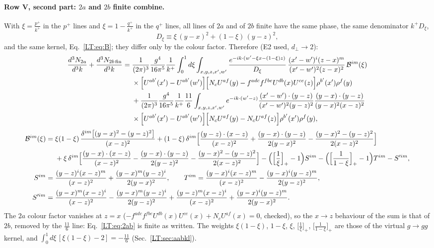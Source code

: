 \documentclass[10pt]{article}
\numberwithin{equation}{section}
\begin{document}
\paragraph{Row V, second part: $2a$ and $2b$ finite combine.} With $\xi=\frac{p^+}{k^+}$ in the $p^+$ lines and $\xi=1-\frac{q^+}{k^+}$ in the $q^+$ lines, all lines of $2a$ and of $2b$ finite have the same phase, the same denominator $k^+D_\xi$,
\begin{equation}
D_\xi\equiv\xi\,(y-x)^2+(1-\xi)\,(y-z)^2,
\end{equation}
and the same kernel, Eq.~\eqref{LT:eq:B}; they differ only by the colour factor. Therefore (E2 used, $d_\perp\to2$):
\begin{align}
\frac{d^3N_{2a}}{d^3k}+\frac{d^3N_{2b\,\rm fin}}{d^3k}={}&\frac{1}{(2\pi)^3}\frac{g^4}{16\pi^5}\frac1{k^+}\int_0^1d\xi\int_{x,y,z,x',w'}\frac{e^{-ik\cdot(w'-\xi x-(1-\xi)z)}}{D_\xi}\,\frac{(x'-w')^{i}(z-x)^{m}}{(x'-w')^{2}(z-x)^{2}}\,\mathcal B^{im}(\xi)\notag\\
&\times\Big[U^{ab'}(x')-U^{ab'}(w')\Big]\Big[N_cU^{af}(y)-f^{adc}f^{fbe}U^{db}(x)U^{ce}(z)\Big]\rho^{b'}(x')\rho^f(y)\notag\\
&+\frac{1}{(2\pi)^{3}}\frac{g^{4}}{16\pi^{5}}\frac{1}{k^{+}}\frac{11}{6}\int_{x,y,z,x',w'}e^{-ik\cdot(w'-z)}\frac{(x'-w')\cdot(y-z)}{(x'-w')^{2}(y-z)^{2}}\frac{(y-x)\cdot(y-z)}{(y-x)^{2}(x-z)^{2}}\notag\\
&\times\Big[U^{ab'}(x')-U^{ab'}(w')\Big]\Big[N_cU^{af}(y)-N_cU^{af}(z)\Big]\rho^{b'}(x')\rho^{f}(y),\label{LT:eq:2ab}
\end{align}
\begin{align}
\mathcal B^{im}(\xi)={}&\xi(1-\xi)\,\frac{\delta^{im}\big[(y-x)^2-(y-z)^2\big]}{(x-z)^2}+(1-\xi)\,\delta^{im}\Big[\frac{(y-z)\cdot(x-z)}{(x-z)^{2}}+\frac{(y-x)\cdot(y-z)}{2(y-x)^{2}}-\frac{(y-x)^{2}-(y-z)^{2}}{2(x-z)^{2}}\Big]\notag\\
&+\xi\,\delta^{im}\Big[\frac{(y-x)\cdot(x-z)}{(x-z)^{2}}-\frac{(y-x)\cdot(y-z)}{2(y-z)^{2}}-\frac{(y-x)^{2}-(y-z)^{2}}{2(x-z)^{2}}\Big]-\Big(\Big[\frac1\xi\Big]_+-1\Big)S^{im}-\Big(\Big[\frac{1}{1-\xi}\Big]_+-1\Big)T^{im}-S'^{im},\label{LT:eq:B}\\
S^{im}={}&\frac{(y-z)^{i}(x-z)^{m}}{(x-z)^{2}}+\frac{(y-x)^{m}(y-z)^{i}}{2(y-x)^{2}},\qquad T^{im}=\frac{(y-x)^{i}(x-z)^{m}}{(x-z)^{2}}-\frac{(y-x)^{i}(y-z)^{m}}{2(y-z)^{2}},\notag\\
S'^{im}={}&\frac{(y-x)^{m}(x-z)^{i}}{(x-z)^{2}}-\frac{(y-x)^{m}(y-z)^{i}}{2(y-z)^{2}}+\frac{(y-z)^{m}(x-z)^{i}}{(x-z)^{2}}+\frac{(y-x)^{i}(y-z)^{m}}{2(y-x)^{2}}.\notag
\end{align}
The $2a$ colour factor vanishes at $z=x$ ($-f^{adc}f^{fbe}U^{db}(x)U^{ce}(x)+N_cU^{af}(x)=0$, checked), so the $x\to z$ behaviour of the sum is that of $2b$, removed by the $\frac{11}{6}$ line: Eq.~\eqref{LT:eq:2ab} is finite as written. The weights $\xi(1-\xi)$, $1-\xi$, $\xi$, $\big[\frac1\xi\big]_+$, $\big[\frac1{1-\xi}\big]_+$ are those of the virtual $g\to gg$ kernel, and $\int_0^1d\xi\,[\xi(1-\xi)-2]=-\frac{11}{6}$ (Sec.~\ref{LT:sec:aabkl}).
\end{document}
